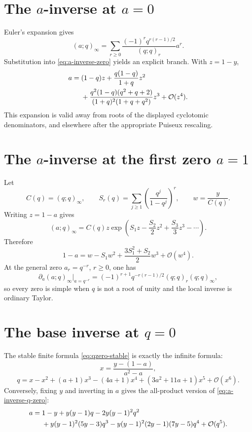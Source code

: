 \documentclass[11pt,oneside]{book}
\theoremstyle{definition}
\theoremstyle{remark}
\newcommand{\OO}{\mathcal{O}}
\begin{document}
\section{The $a$-inverse at $a=0$}
Euler's expansion gives
\[
 (a;q)_\infty=\sum_{r\ge0}
 \frac{(-1)^rq^{r(r-1)/2}}{(q;q)_r}a^r.
\]
Substitution into \eqref{eq:a-inverse-zero} yields an explicit branch.  With
$z=1-y$,
\begin{align}
 a={}&(1-q)z+\frac{q(1-q)}{1+q}z^2\notag\\
 &+\frac{q^2(1-q)(q^2+q+2)}{(1+q)^2(1+q+q^2)}z^3
 +\OO(z^4).\label{eq:ainf-near-zero}
\end{align}
This expansion is valid away from roots of the displayed cyclotomic
denominators, and elsewhere after the appropriate Puiseux rescaling.

\section{The $a$-inverse at the first zero $a=1$}
Let
\[
 C(q)=(q;q)_\infty,
 \qquad S_r(q)=\sum_{j\ge1}\left(\frac{q^j}{1-q^j}\right)^r,
 \qquad w=\frac{y}{C(q)}.
\]
Writing $z=1-a$ gives
\[
 (a;q)_\infty=C(q)z
 \exp\left(S_1z-\frac{S_2}{2}z^2+\frac{S_3}{3}z^3-\cdots\right).
\]
Therefore
\begin{equation}\label{eq:ainf-near-one}
 1-a=w-S_1w^2+\frac{3S_1^2+S_2}{2}w^3+\OO(w^4).
\end{equation}
At the general zero $a_r=q^{-r}$, $r\ge0$, one has
\begin{equation}\label{eq:infinite-a-derivative-root}
 \partial_a(a;q)_\infty\big|_{a=q^{-r}}
 =(-1)^{r+1}q^{-r(r-1)/2}(q;q)_r(q;q)_\infty,
\end{equation}
so every zero is simple when $q$ is not a root of unity and the local inverse
is ordinary Taylor.

\section{The base inverse at $q=0$}
The stable finite formula \eqref{eq:qzero-stable} is exactly the infinite
formula:
\[
 x=\frac{y-(1-a)}{a^2-a},
\]
\begin{equation}\label{eq:qinftyprod-qzero}
 q=x-x^2+(a+1)x^3-(4a+1)x^4
 +(3a^2+11a+1)x^5+\OO(x^6).
\end{equation}
Conversely, fixing $y$ and inverting in $a$ gives the all-product version of
\eqref{eq:a-inverse-q-zero}:
\begin{align}
 a={}&1-y+y(y-1)q-2y(y-1)^2q^2\notag\\
 &+y(y-1)^2(5y-3)q^3
 -y(y-1)^2(2y-1)(7y-5)q^4+\OO(q^5).
 \label{eq:ainf-qzero-fixed-y}
\end{align}
\end{document}
